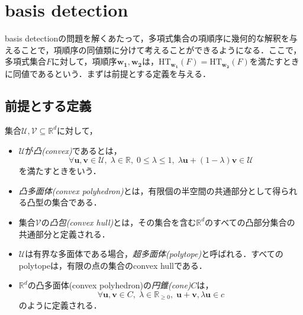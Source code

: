\section{\groebner{} basis detection}
\groebner{} basis detectionの問題を解くあたって，多項式集合の項順序に幾何的な解釈を与えることで，項順序の同値類に分けて考えることができるようになる．ここで，多項式集合$F$に対して，項順序$\bm{w_1}, \bm{w_2}$は，$\mathrm{HT}_{\bm{w_1}}(F) = \mathrm{HT}_{\bm{w_2}}(F)$を満たすときに同値であるという．まずは前提とする定義を与える．
\subsection{前提とする定義}

\begin{definition}
	集合$\mathcal{U, V} \subseteq \mathbb{R}^d$に対して，
	\begin{itemize}
		\item $\mathcal{U}$が\emph{凸(convex)}であるとは，$$\forall \bm{u, v} \in \mathcal{U}, \; \lambda \in \mathbb{R}, \; 0 \le \lambda \le 1, \; \lambda\bm{u} + (1 - \lambda) \bm{v} \in \mathcal{U}$$を満たすときをいう．
		\item \emph{凸多面体(convex polyhedron)}とは，有限個の半空間の共通部分として得られる凸型の集合である．
		\item 集合$\mathcal{V}$の\emph{凸包(convex hull)}とは，その集合を含む$\mathbb{R}^d$のすべての凸部分集合の共通部分と定義される．
		\item  $\mathcal{U}$は有界な多面体である場合，\emph{超多面体(polytope)}と呼ばれる．すべてのpolytopeは，有限の点の集合のconvex hullである．
		\item $\mathbb{R}^d$の凸多面体(convex polyhedron)の\emph{円錐(cone)}$C$は，$$\forall \bm{u, v} \in C, \; \lambda \in \mathbb{R}_{\ge 0}, \; \bm{u+v}, \lambda\bm{u} \in c$$のように定義される．
	\end{itemize}
\end{definition}
